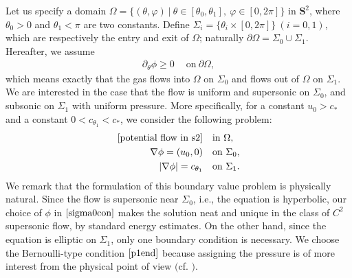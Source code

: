 \documentclass[reqno,12pt]{amsart}
\numberwithin{equation}{section}
\begin{document}
Let us specify a domain $\Omega=\{(\theta, \varphi)~|~\theta\in[\theta_0,\theta_1],~\varphi \in [0,2\pi]\}$ in $\mathbf{S}^2$, where $\theta_0>0$ and $\theta_1<\pi$ are two constants. Define $\Sigma_i=\{\theta_i\times[0,2\pi]\}~(i=0,1)$, which are respectively the entry and exit of $\Omega$; naturally $\partial\Omega=\Sigma_0\cup\Sigma_1$. Hereafter, we assume 
	\begin{align}\label{h1}
		\partial_{\theta}\phi\geq0 ~\quad \text{on}~\partial\Omega,
	\end{align}
which means exactly that the gas flows into $\Omega$ on $\Sigma_0$ and flows out of $\Omega$ on $\Sigma_1$. We are interested in the case that the flow is uniform and supersonic on $\Sigma_0$, and subsonic on $\Sigma_1$ with uniform pressure. More specifically, for a constant $u_0>c_{*}$ and a constant $0<c_{\theta_1 }<c_{*}$, we consider the following problem:
	\begin{align}\label{p1}
		\eqref{potential flow in s2} \quad &\text{in}~\Omega,\\
		\nabla\phi=(u_0,0) \quad &\text{on} ~\Sigma_0,\label{sigma0con}\\
		|\nabla \phi|=c_{\theta_1 } \quad &\text{on}~\Sigma_1.\label{p1end}
	\end{align}
We remark that the formulation of this boundary value problem is physically natural. Since the flow is supersonic near $\Sigma_0$, i.e., the equation is hyperbolic, our choice of $\phi$ in $\eqref{sigma0con}$ makes the solution neat and unique in the class of $C^2$ supersonic flow, by standard energy estimates. On the other hand, since the equation is elliptic on $\Sigma_1$, only one boundary condition is necessary. We choose the Bernoulli-type condition $\eqref{p1end}$ because assigning the pressure is of more interest from the physical point of view $($cf. \cite{supshockCF}$)$.
\end{document}
